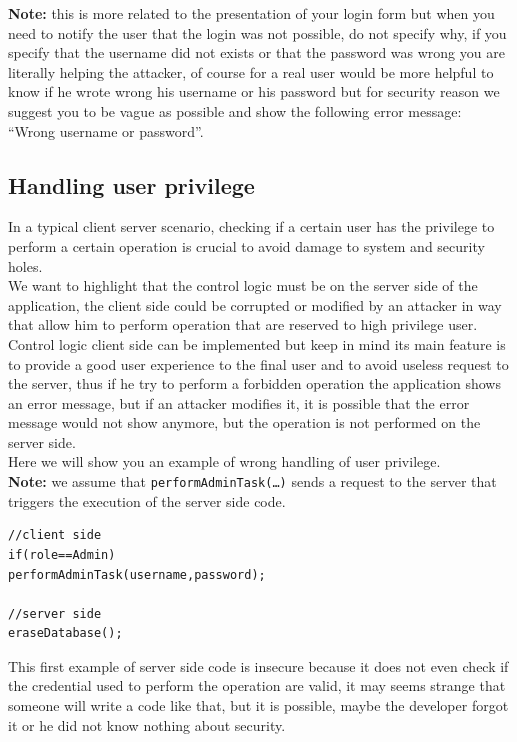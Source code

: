 \textbf{Note:} this is more related to the presentation of your login form but when you need to notify the user that the login was not possible, do not specify why, if you specify that the username did not exists or that the password was wrong you are literally helping the attacker, of course for a real user would be more helpful to know if he wrote wrong his username or his password but for security reason we suggest you to be vague as possible and show the following error message: “Wrong username or password”.

\subsection{Handling user privilege}
In a typical client server scenario, checking if a certain user has the privilege to perform a certain operation is crucial to avoid damage to system and security holes.\\

We want to highlight that the control logic must be on the server side of the application, the client side could be corrupted or modified by an attacker in way that allow him to perform operation that are reserved to high privilege user.\\

Control logic client side can be implemented but keep in mind its main feature is to provide a good user experience to the final user and to avoid useless request to the server, thus if he try to perform a forbidden operation the application shows an error message, but if an attacker modifies it, it is possible that the error message would not show anymore, but the operation is not performed on the server side.\\

Here we will show you an example of wrong handling of user privilege.\\
\textbf{Note:} we assume that \texttt{performAdminTask(…)} sends a request to the server that triggers the execution of the server side code.

\begin{lstlisting}
//client side
if(role==Admin)
performAdminTask(username,password);

//server side
eraseDatabase();
\end{lstlisting}

This first example of server side code is insecure because it does not even check if the credential used to perform the operation are valid, it may seems strange that someone will write a code like that, but it is possible, maybe the developer forgot it or he did not know nothing about security.\\

